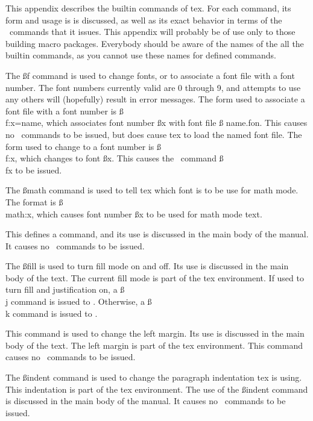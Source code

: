 
This appendix describes the builtin commands of tex. For each
command, its form and usage is is discussed, as well as its
exact behavior in terms of the \pfont\ commands that it issues.
This appendix will probably be of use only to those building
macro packages. Everybody should be aware of the names of the all
the builtin commands, as you cannot use these names for defined
commands.

{\describe

 The {\ss f} command is used to change fonts, or to
associate a font file with a font number. The font numbers
currently valid are 0 through 9, and attempts to use any others
will (hopefully) result in error messages. The form used to
associate a font file with a font number is {\ss \\f:x=name,}
which associates font number {\ss x} with font file {\ss
name.fon.} This causes no \pfont\ commands to be issued, but does
cause tex to load the named font file. The form used to change to
a font number is {\ss \\f:x}, which changes to font {\ss x.} This
causes the \pfont\ command {\ss \\fx} to be issued.

 The {\ss math} command is used to tell tex which font
is to be use for math mode. The format is {\ss \\math:x,}  which
causes font number {\ss x} to be used for math mode text.

 This defines a command, and its use is discussed in
the main body of the manual. It causes no \pfont\ commands to be
issued.

 The {\ss fill} is used to turn fill mode on and off.
Its use is discussed in the main body of the text. The current
fill mode is part of the tex environment. If used to turn fill
and justification on, a {\ss \\j} command is issued to \pfont.
Otherwise, a {\ss \\k} command is issued to \pfont.

 This command is used to change the left margin. Its
use is discussed in the main body of the text. The left margin is
part of the tex environment. This command causes no \pfont\ commands to be
issued.

 The {\ss indent} command is used to change the
paragraph indentation tex is using. This indentation is part of
the tex environment. The use of the {\ss indent} command is
discussed in the main body of the manual. It causes no \pfont\ 
commands to be issued.

}
